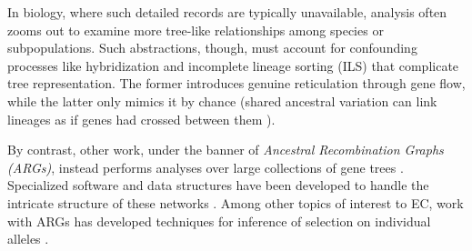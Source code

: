 In biology, where such detailed records are typically unavailable, analysis often zooms out to examine more tree-like relationships among species or subpopulations.
Such abstractions, though, must account for confounding processes like hybridization and incomplete lineage sorting (ILS) that complicate tree representation.
The former introduces genuine reticulation through gene flow, while the latter only mimics it by chance (shared ancestral variation can link lineages as if genes had crossed between them \citep{tajima1983evolutionary}).

By contrast, other work, under the banner of \textit{Ancestral Recombination Graphs (ARGs)}, instead performs analyses over large collections of gene trees \citep{nielsen2024inference,lewanski2024era,griffiths1997ancestral}.
Specialized software and data structures have been developed to handle the intricate structure of these networks \citep{godindubois2024apoget,kelleher2019inferring,wong2024args,jeffery2026tskit}.
Among other topics of interest to EC, work with ARGs has developed techniques for inference of selection on individual alleles \citep{hejase2021deeplearning,rasmussen2014genome,vaughn2024fast,korfmann2024simultaneous,hejase2020summary}.
